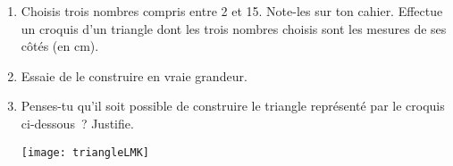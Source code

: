 
\begin{activite}

\begin{enumerate}
\item Choisis trois nombres compris entre 2 et 15. Note-les sur ton cahier. Effectue un croquis d'un triangle dont les trois nombres choisis sont les mesures de ses côtés (en cm).

\item Essaie de le construire en vraie grandeur.

\item Penses-tu qu'il soit possible de construire le triangle représenté par le croquis ci-dessous ? Justifie.

\begin{center} \texttt{[image: triangleLMK]} \end{center}
\end{enumerate}

\end{activite}


